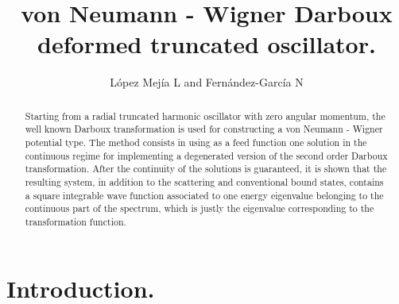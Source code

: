 \documentclass[a4paper]{jpconf}
\begin{document}
\title{von Neumann - Wigner Darboux deformed truncated oscillator.} 

\author{L\' opez Mej\' ia L and Fern\' andez-Garc\' ia N}

\address{Instituto Polit\' ecnico Nacional, UPIITA, Av. I.P.N. 2580, Col. La Laguna Ticom\' an, 07360 M\' exico
City, Mexico.}


\begin{abstract}
Starting from a radial truncated harmonic oscillator with zero angular momentum, the well known Darboux transformation is used for constructing a von Neumann - Wigner potential type. The method consists in using as a feed function one solution in the continuous regime for implementing a degenerated version of the second order Darboux transformation. After the continuity of the solutions is guaranteed, it is shown that the resulting system, in addition to the scattering and conventional bound states, contains a square integrable wave function associated to one energy eigenvalue belonging to the continuous part of the spectrum, which is justly the eigenvalue corresponding to the transformation function. 



\end{abstract}
\section{Introduction.}
\end{document}
